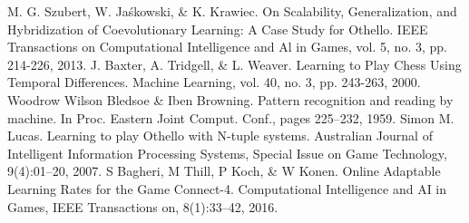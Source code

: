 \documentclass{suribt}
\begin{document}
\begin{thebibliography}{}
  M. G. Szubert, W. Ja\'{s}kowski, \& K. Krawiec. On Scalability, Generalization, and Hybridization of Coevolutionary Learning: A Case Study for Othello. IEEE Transactions on Computational Intelligence and Al in Games, vol. 5, no. 3, pp. 214-226, 2013.
  J. Baxter, A. Tridgell, \& L. Weaver. Learning to Play Chess Using Temporal Differences. Machine Learning, vol. 40, no. 3, pp. 243-263, 2000.
  Woodrow Wilson Bledsoe \& Iben Browning. Pattern recognition and reading by machine. In Proc. Eastern Joint Comput. Conf., pages 225–232, 1959.
  Simon M. Lucas. Learning to play Othello with N-tuple systems. Australian Journal of Intelligent Information Processing Systems, Special Issue on Game Technology, 9(4):01–20, 2007.
  S Bagheri, M Thill, P Koch, \& W Konen. Online Adaptable Learning Rates for the Game Connect-4. Computational Intelligence
and AI in Games, IEEE Transactions on, 8(1):33–42, 2016.
\end{thebibliography}
\end{document}
